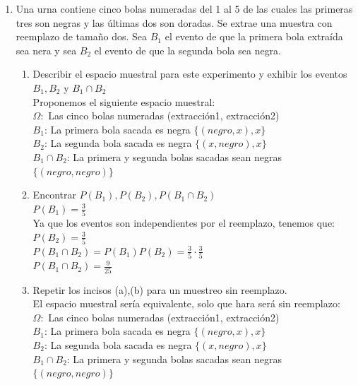 \documentclass[12pt,a4paper]{report}
\begin{document}
\begin{enumerate}
   \item {
  Una urna contiene cinco bolas numeradas del 1 al 5 de las cuales las primeras tres son negras y las últimas dos son doradas. Se extrae una muestra con reemplazo de tamaño dos. Sea $B_{1}$ el evento de que la primera bola extraída sea nera y sea $B_{2}$ el evento de que la segunda bola sea negra.
\begin{enumerate}[label=\alph*) ]
	\item{Describir el espacio muestral para este experimento y exhibir los eventos $B_{1},B_{2}$ y $B_{1}\cap B_{2}$ \\

	Proponemos el siguiente espacio muestral:\\
	$\Omega:$ Las cinco bolas numeradas {(extracción1, extracción2)}\\
	$B_{1}$: La primera bola sacada es negra $\{(negro,x),x\}$\\
	$B_{2}$: La segunda bola sacada es negra $\{(x,negro),x\}$\\
	$B_{1}\cap B_{2}$: La primera y segunda bolas sacadas sean negras $\{(negro,negro)\}$\\

	}

	\item{Encontrar $P(B_{1}),P(B_{2}),P(B_{1}\cap B_{2})$\\

 	$P(B_{1}) = \frac{3}{5}$\\
 	Ya que los eventos son independientes por el reemplazo, tenemos que:
 	$P(B_{2}) = \frac{3}{5}$\\
 	$P(B_{1}\cap B_{2}) = P(B_{1})P(B_{2}) = \frac{3}{5} \cdot \frac{3}{5}$\\
 	$P(B_{1}\cap B_{2}) = \frac{9}{25}$\\

	}

	\item{Repetir los incisos (a),(b) para un muestreo sin reemplazo. \\

	El espacio muestral sería equivalente, solo que hara será sin reemplazo:\\
	$\Omega:$ Las cinco bolas numeradas {(extracción1, extracción2)}\\
	$B_{1}$: La primera bola sacada es negra $\{(negro,x),x\}$\\
	$B_{2}$: La segunda bola sacada es negra $\{(x,negro),x\}$\\
	$B_{1}\cap B_{2}$: La primera y segunda bolas sacadas sean negras $\{(negro,negro)\}$\\

}
\end{enumerate}}
\end{enumerate}
\end{document}
